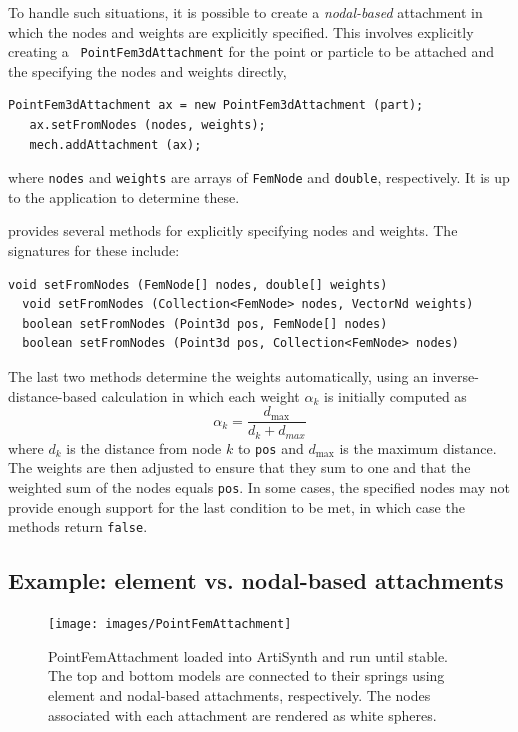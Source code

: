 To handle such situations, it is possible to create a {\it
nodal-based} attachment in which the nodes and weights are explicitly
specified. This involves explicitly creating a {\tt
PointFem3dAttachment} for the point or particle to be attached and the
specifying the nodes and weights directly,
%
\begin{lstlisting}[]
   PointFem3dAttachment ax = new PointFem3dAttachment (part);
   ax.setFromNodes (nodes, weights);
   mech.addAttachment (ax);
\end{lstlisting}
%
where {\tt nodes} and {\tt weights} are arrays of {\tt FemNode} and
{\tt double}, respectively. It is up to the application to determine
these.

 provides
several methods for explicitly specifying nodes and weights. The
signatures for these include:
\begin{lstlisting}[]
  void setFromNodes (FemNode[] nodes, double[] weights)
  void setFromNodes (Collection<FemNode> nodes, VectorNd weights)
  boolean setFromNodes (Point3d pos, FemNode[] nodes)
  boolean setFromNodes (Point3d pos, Collection<FemNode> nodes)
\end{lstlisting}
The last two methods determine the weights automatically, using an
inverse-distance-based calculation in which each weight $\alpha_k$
is initially computed as
%
\begin{equation}
\alpha_k = \frac{d_{\text{max}}}{d_k + d_{max}}
\label{invDistWeights:eqn}
\end{equation}
%
where $d_k$ is the distance from node $k$ to {\tt pos} and
$d_{\text{max}}$ is the maximum distance. The weights are then
adjusted to ensure that they sum to one and that the weighted sum of
the nodes equals {\tt pos}. In some cases, the specified nodes
may not provide enough support for the last condition to be
met, in which case the methods return {\tt false}.

\subsection{Example: element vs. nodal-based attachments}

\begin{figure}[ht]
\centering
{}
\texttt{[image: images/PointFemAttachment]}
\caption{PointFemAttachment loaded into ArtiSynth and run until stable.
The top and bottom models are connected to their springs using element
and nodal-based attachments, respectively.  The nodes associated with
each attachment are rendered as white spheres.}
\label{fig:fem:pointFemAttachment}
\end{figure}

